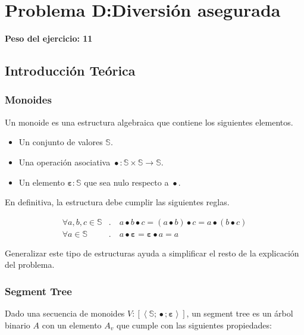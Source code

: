 \newpage{}
\section{Problema D:\@ Diversión asegurada}
\textbf{Peso del ejercicio: 11 }

\newcommand{\mappend}{\operatorname{\bullet}}
\newcommand{\mempty}{\mathbf{\varepsilon}}
\newcommand{\sizeV}{\left|V\right|}

\subsection{Introducción Teórica}

\subsubsection{Monoides}

Un monoide es una estructura algebraica que contiene los siguientes elementos.

\begin{itemize}
	\item Un conjunto de valores \(\mathbb{S}\).
	\item Una operación asociativa \(\mappend : \mathbb{S} \times \mathbb{S} \rightarrow \mathbb{S}\).
	\item Un elemento \(\mempty : \mathbb{S}\) que sea nulo respecto a \(\mappend\).
\end{itemize}

En definitiva, la estructura debe cumplir las siguientes reglas.

\[
\begin{aligned}
	\forall a, b, c \in \mathbb{S}&. \quad a \mappend b \mappend c = (a \mappend b) \mappend c = a \mappend (b \mappend c) \\
	\forall a \in \mathbb{S}&. \quad a \mappend \mempty = \mempty \mappend a = a
\end{aligned}
\]

Generalizar este tipo de estructuras ayuda a simplificar el resto de la explicación del problema.

\subsubsection{Segment Tree}

Dado una secuencia de monoides \(V : \left[\left<\mathbb{S}; \mappend; \mempty\right>\right]\), un segment tree es un árbol binario \(A\) con un elemento \(A_v\) que cumple con las siguientes propiedades:

